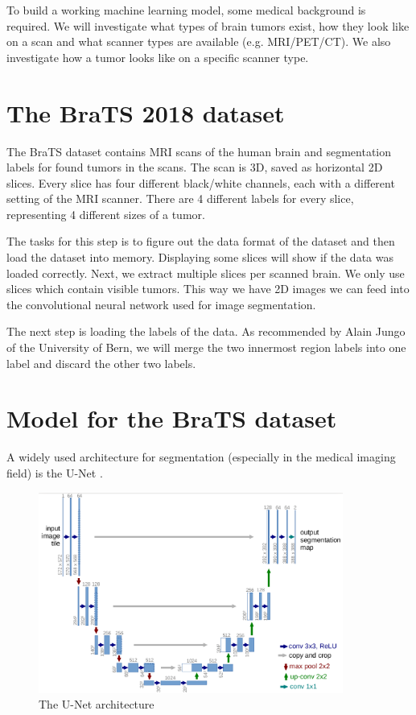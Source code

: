 To build a working machine learning model, some medical background is required. We will investigate what types of brain tumors exist, how they look like on a scan and what scanner types are available (e.g. MRI/PET/CT). We also investigate how a tumor looks like on a specific scanner type.

\section{The BraTS 2018 dataset}
The BraTS \cite{menze2015multimodal} dataset contains MRI scans of the human brain and segmentation labels for found tumors in the scans.
The scan is 3D, saved as horizontal 2D slices. Every slice has four different black/white channels, each with a different setting of the MRI scanner.
There are 4 different labels for every slice, representing 4 different sizes of a tumor.

The tasks for this step is to figure out the data format of the dataset and then load the dataset into memory. Displaying some slices will show if the data was loaded correctly. Next, we extract multiple slices per scanned brain. We only use slices which contain visible tumors. This way we have 2D images we can feed into the convolutional neural network used for image segmentation.

The next step is loading the labels of the data. As recommended by Alain Jungo of the University of Bern, we will merge the two innermost region labels into one label and discard the other two labels.

\section{Model for the BraTS dataset}
A widely used architecture for segmentation (especially in the medical imaging field) is the U-Net \cite{ronneberger2015u}.

\begin{figure}[H]
\centering
\caption{The U-Net architecture}
\includegraphics[width=10cm]{images/unet.png}
\end{figure}

